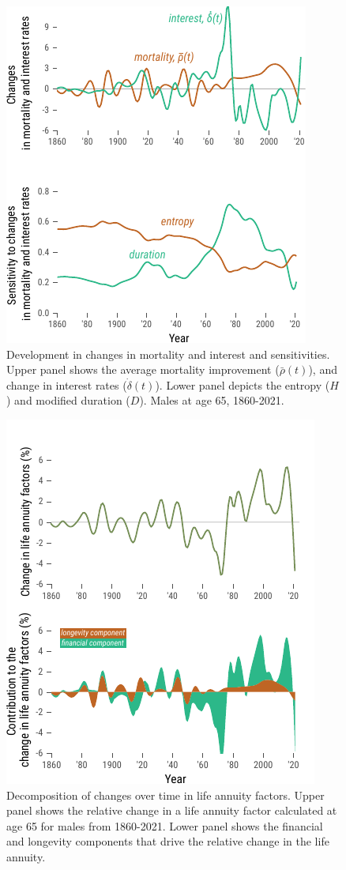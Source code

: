 \documentclass[12pt]{article}
\begin{document}
\begin{figure}[!ht]
	\centering
	\includegraphics[width=0.5\linewidth]{Fig/changeMortalityInterestAndSensitivities}
	\caption{{Development in changes in mortality and interest and sensitivities. Upper panel shows the average mortality improvement ($\bar{\rho}(t)$), and change in interest rates ($\dot{\delta}(t)$). Lower panel depicts the entropy ($H$) and modified duration ($D$). Males at age 65, 1860-2021.}}
	\label{fig:Fig3}
\end{figure}


\begin{figure}[!ht]
	\centering
	\includegraphics[width=0.5\linewidth]{Fig/decompositionLongTermSingleInterestRates}
	\caption{{Decomposition of changes over time in life annuity factors. Upper panel shows the relative change in a life annuity factor calculated at age 65 for males from 1860-2021. Lower panel shows the financial and longevity components that drive the relative change in the life annuity. }}
	\label{fig:Fig4}
\end{figure}
\end{document}
